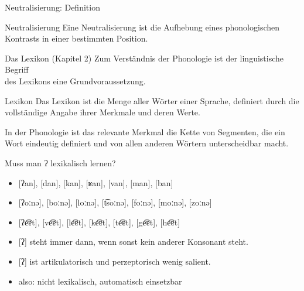 \begin{frame}
  {Neutralisierung: Definition}
  \pause
  \Large
  \begin{block}{Neutralisierung}
    Eine Neutralisierung ist die Aufhebung eines phonologischen Kontrasts in einer bestimmten Position.    
  \end{block}
\end{frame}

\begin{frame}
  {Das Lexikon (Kapitel 2)}
  \pause
  \large Zum Verständnis der Phonologie ist der linguistische Begriff\\
  des Lexikons eine Grundvoraussetzung.\\
  \Large
  \Zeile
  \begin{block}{Lexikon}
    Das \alert{Lexikon} ist die Menge aller Wörter einer Sprache, definiert durch die vollständige Angabe ihrer Merkmale und deren Werte.    
  \end{block}
  \pause
  \Zeile
  \large
  In der Phonologie ist das relevante Merkmal die \alert{Kette von Segmenten}, die ein Wort eindeutig definiert und von allen anderen Wörtern unterscheidbar macht.
\end{frame}

\begin{frame}
  {Muss man ʔ lexikalisch lernen?}
  \pause
  \begin{itemize}
    \item{[ʔan], [dan], [kan], [ʁan], [van], [man], [ban]}
    \item{[ʔoːnə], [boːnə], [loːnə], [t͡soːnə], [foːnə], [moːnə], [zoːnə]}
    \item{[ʔe͡ɐt], [ve͡ɐt], [le͡ɐt], [ke͡ɐt], [te͡ɐt], [ge͡ɐt], [he͡ɐt]}
  \end{itemize}
  \Zeile
  \pause
  \begin{itemize}[<+->]
    \item{\alert{[ʔ] steht immer dann, wenn sonst kein anderer Konsonant steht.}}
    \item{[ʔ] ist artikulatorisch und perzeptorisch wenig salient.}
    \item also: nicht lexikalisch, \alert{automatisch einsetzbar}
  \end{itemize}
\end{frame}

